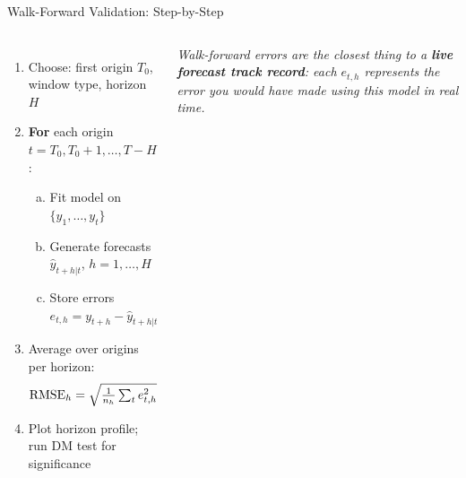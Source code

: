 \documentclass[aspectratio=169, 11pt]{beamer}
\begin{document}
\begin{frame}{Walk-Forward Validation: Step-by-Step}
  \begin{columns}[T]
      \begin{enumerate}\small
        \item Choose: first origin $T_0$, window type, horizon $H$
        \item \textbf{For} each origin $t = T_0, T_0+1, \ldots, T-H$:
          \begin{enumerate}[(a)]\footnotesize
            \item Fit model on $\{y_1,\ldots,y_t\}$
            \item Generate forecasts $\hat{y}_{t+h|t}$, $h=1,\ldots,H$
            \item Store errors $e_{t,h} = y_{t+h} - \hat{y}_{t+h|t}$
          \end{enumerate}
        \item Average over origins per horizon:
          \[
            \operatorname{RMSE}_h = \sqrt{\tfrac{1}{n_h}\textstyle\sum_t e_{t,h}^2}
          \]
        \item Plot horizon profile; run DM test for significance
      \end{enumerate}
      \textit{Walk-forward errors are the closest thing to a \textbf{live
      forecast track record}: each $e_{t,h}$ represents the error you
      would have made using this model in real time.}
      \vspace{0.1cm}
  \end{columns}
\end{frame}
\end{document}
